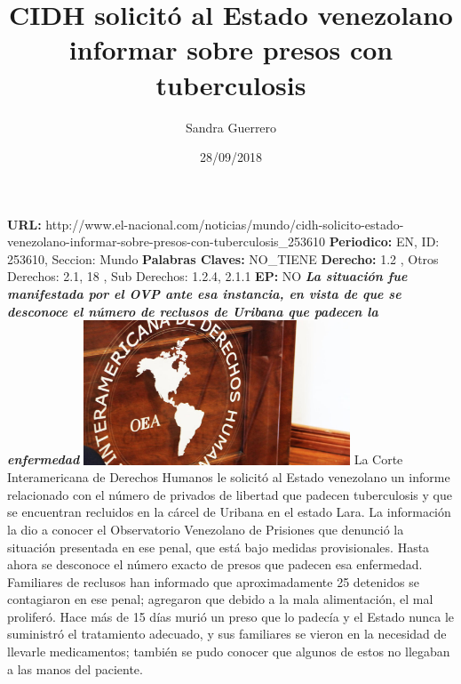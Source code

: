 \documentclass{article}%
\title{\textbf{CIDH solicitó al Estado venezolano informar sobre presos con tuberculosis}}%
\author{Sandra Guerrero}%
\date{28/09/2018}%
\begin{document}
%
\normalsize%
\maketitle%
\textbf{URL: }%
http://www.el{-}nacional.com/noticias/mundo/cidh{-}solicito{-}estado{-}venezolano{-}informar{-}sobre{-}presos{-}con{-}tuberculosis\_253610\newline%
%
\textbf{Periodico: }%
EN, %
ID: %
253610, %
Seccion: %
Mundo\newline%
%
\textbf{Palabras Claves: }%
NO\_TIENE\newline%
%
\textbf{Derecho: }%
1.2%
, Otros Derechos: %
2.1, 18%
, Sub Derechos: %
1.2.4, 2.1.1%
\newline%
%
\textbf{EP: }%
NO\newline%
\newline%
%
\textbf{\textit{La situación fue manifestada por el OVP ante esa instancia, en vista de que se desconoce el número de reclusos de Uribana que padecen la enfermedad}}%
\newline%
\newline%
%
\includegraphics[width=300px]{169.jpg}%
\newline%
%
La Corte Interamericana de Derechos Humanos le solicitó al Estado venezolano un informe relacionado con el número de privados de libertad que padecen tuberculosis y que se encuentran recluidos en la cárcel de Uribana en el estado Lara.%
\newline%
%
La información la dio a conocer el Observatorio Venezolano de Prisiones que denunció la situación presentada en ese penal, que está bajo medidas provisionales.%
\newline%
%
Hasta ahora se desconoce el número exacto de presos que padecen esa enfermedad. Familiares de reclusos han informado que aproximadamente 25 detenidos se contagiaron en ese penal; agregaron que debido a la mala alimentación, el mal proliferó.%
\newline%
%
Hace más de 15 días murió un preso que lo padecía y el Estado nunca le suministró el tratamiento adecuado, y sus familiares se vieron en la necesidad de llevarle medicamentos; también se pudo conocer que algunos de estos no llegaban a las manos del paciente.%
\end{document}
